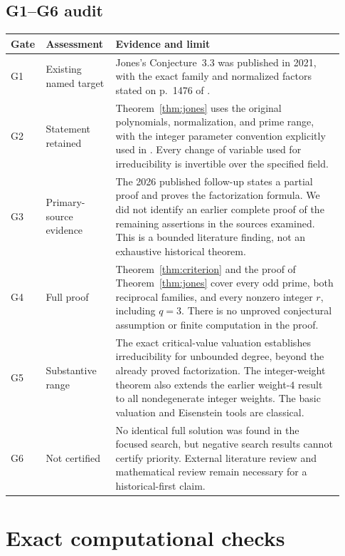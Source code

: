 \documentclass[11pt,a4paper]{article}
\theoremstyle{definition}
\theoremstyle{remark}
\begin{document}
\subsection{G1--G6 audit}
\renewcommand{\arraystretch}{1.15}
\begin{longtable}{@{}p{0.07\linewidth}p{0.20\linewidth}p{0.66\linewidth}@{}}
\toprule
Gate & Assessment & Evidence and limit\\
\midrule
G1 & Existing named target & Jones's Conjecture~3.3 was published in
2021, with the exact family and normalized factors stated on p.~1476
of \cite{Jones}.\\
G2 & Statement retained & Theorem~\ref{thm:jones} uses the original
polynomials, normalization, and prime range, with the integer
parameter convention explicitly used in \cite{BNW}. Every change
of variable used for irreducibility is invertible over the
specified field.\\
G3 & Primary-source evidence & The 2026 published follow-up
\cite{BNW} states a partial proof and proves the factorization
formula. We did not identify an earlier complete proof of the
remaining assertions in the sources examined. This is a bounded
literature finding, not an exhaustive historical theorem.\\
G4 & Full proof & Theorem~\ref{thm:criterion} and the proof of
Theorem~\ref{thm:jones} cover every odd prime, both reciprocal families, and every nonzero
integer $r$, including $q=3$. There is no unproved conjectural
assumption or finite computation in the proof.\\
G5 & Substantive range & The exact critical-value valuation establishes
irreducibility for unbounded degree, beyond the already proved
factorization. The integer-weight theorem also extends the earlier
weight-$4$ result to all nondegenerate integer weights. The basic
valuation and Eisenstein tools are classical.\\
G6 & Not certified & No identical full solution was found in the
focused search, but negative search results cannot certify
priority. External literature review and mathematical review
remain necessary for a historical-first claim.\\
\bottomrule
\end{longtable}
\renewcommand{\arraystretch}{1}

\clearpage
\appendix
\section{Exact computational checks}\label{sec:checks}
\end{document}
